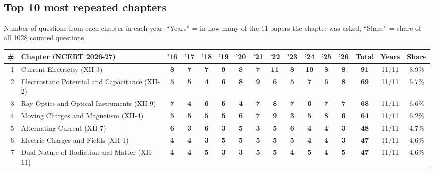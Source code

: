 \documentclass[10pt,a4paper]{article}
\begin{document}
\subsection*{Top 10 most repeated chapters}
{\small Number of questions from each chapter in each year. ``Years'' = in how many of the 11 papers the chapter was asked; ``Share'' = share of all 1028 counted questions.}\par\smallskip
{\footnotesize\setlength{\tabcolsep}{2.6pt}\renewcommand{\arraystretch}{1.25}
\begin{tabularx}{\linewidth}{@{}r>{\raggedright\arraybackslash}X*{11}{c}ccc@{}}\toprule
\# & Chapter (NCERT 2026-27) & '16 & '17 & '18 & '19 & '20 & '21 & '22 & '23 & '24 & '25 & '26 & Total & Years & Share\\\midrule
1 & Current Electricity {\scriptsize(XII-3)} & \textbf{8} & \textbf{7} & \textbf{7} & \textbf{9} & \textbf{8} & \textbf{7} & \textbf{11} & \textbf{8} & \textbf{10} & \textbf{8} & \textbf{8} & \textbf{91} & 11/11 & 8.9\%\\
2 & Electrostatic Potential and Capacitance {\scriptsize(XII-2)} & \textbf{5} & \textbf{5} & \textbf{4} & \textbf{6} & \textbf{8} & \textbf{9} & \textbf{6} & \textbf{5} & \textbf{7} & \textbf{6} & \textbf{8} & \textbf{69} & 11/11 & 6.7\%\\
3 & Ray Optics and Optical Instruments {\scriptsize(XII-9)} & \textbf{7} & \textbf{4} & \textbf{6} & \textbf{5} & \textbf{4} & \textbf{7} & \textbf{8} & \textbf{7} & \textbf{6} & \textbf{7} & \textbf{7} & \textbf{68} & 11/11 & 6.6\%\\
4 & Moving Charges and Magnetism {\scriptsize(XII-4)} & \textbf{5} & \textbf{5} & \textbf{5} & \textbf{5} & \textbf{6} & \textbf{7} & \textbf{9} & \textbf{3} & \textbf{5} & \textbf{8} & \textbf{6} & \textbf{64} & 11/11 & 6.2\%\\
5 & Alternating Current {\scriptsize(XII-7)} & \textbf{6} & \textbf{3} & \textbf{6} & \textbf{3} & \textbf{5} & \textbf{3} & \textbf{5} & \textbf{6} & \textbf{4} & \textbf{4} & \textbf{3} & \textbf{48} & 11/11 & 4.7\%\\
6 & Electric Charges and Fields {\scriptsize(XII-1)} & \textbf{4} & \textbf{4} & \textbf{3} & \textbf{5} & \textbf{5} & \textbf{5} & \textbf{5} & \textbf{5} & \textbf{4} & \textbf{4} & \textbf{3} & \textbf{47} & 11/11 & 4.6\%\\
7 & Dual Nature of Radiation and Matter {\scriptsize(XII-11)} & \textbf{4} & \textbf{4} & \textbf{5} & \textbf{3} & \textbf{3} & \textbf{5} & \textbf{5} & \textbf{4} & \textbf{5} & \textbf{4} & \textbf{5} & \textbf{47} & 11/11 & 4.6\%\\

\end{tabularx}}
\end{document}

